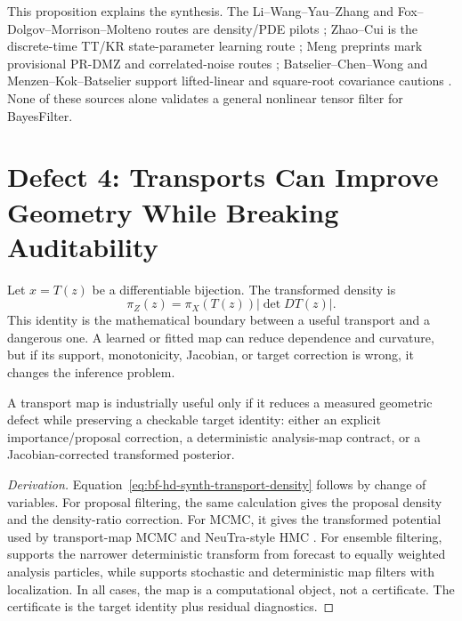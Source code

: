 This proposition explains the synthesis.  The Li--Wang--Yau--Zhang and
Fox--Dolgov--Morrison--Molteno routes are density/PDE pilots
\citep{li2019ttfiltering,fox2021grid}; Zhao--Cui is the discrete-time
TT/KR state-parameter learning route \citep{zhao2024ttsequential}; Meng
preprints mark provisional PR-DMZ and correlated-noise routes
\citep{meng2025regularity,meng2026correlated}; Batselier--Chen--Wong and
Menzen--Kok--Batselier support lifted-linear and square-root covariance
cautions \citep{batselier2016tnkf,menzen2024tnsrkf}.  None of these sources
alone validates a general nonlinear tensor filter for BayesFilter.

\section{Defect 4: Transports Can Improve Geometry While Breaking Auditability}
\label{sec:bf-hd-defect-transport}

Let \(x=T(z)\) be a differentiable bijection.  The transformed density is
\begin{equation}
  \pi_Z(z)=\pi_X(T(z))|\det DT(z)|.
  \label{eq:bf-hd-synth-transport-density}
\end{equation}
This identity is the mathematical boundary between a useful transport and a
dangerous one.  A learned or fitted map can reduce dependence and curvature,
but if its support, monotonicity, Jacobian, or target correction is wrong, it
changes the inference problem.

\begin{proposition}
\label{prop:bf-hd-transport-auditability}
A transport map is industrially useful only if it reduces a measured geometric
defect while preserving a checkable target identity: either an explicit
importance/proposal correction, a deterministic analysis-map contract, or a
Jacobian-corrected transformed posterior.
\end{proposition}

\begin{proof}[Derivation]
Equation~\eqref{eq:bf-hd-synth-transport-density} follows by change of
variables.  For proposal filtering, the same calculation gives the proposal
density and the density-ratio correction.  For MCMC, it gives the transformed
potential used by transport-map MCMC and NeuTra-style HMC
\citep{parno2018transport,hoffman2019neutra}.  For ensemble filtering,
\citet{reich2013nonparametric} supports the narrower deterministic transform
from forecast to equally weighted analysis particles, while
\citet{spantini2022coupling} supports stochastic and deterministic map filters
with localization.  In all cases, the map is a computational object, not a
certificate.  The certificate is the target identity plus residual diagnostics.
\end{proof}

